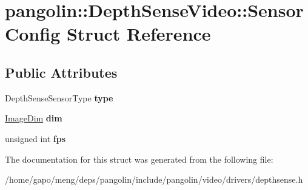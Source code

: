 \hypertarget{structpangolin_1_1_depth_sense_video_1_1_sensor_config}{}\section{pangolin\+:\+:Depth\+Sense\+Video\+:\+:Sensor\+Config Struct Reference}
\label{structpangolin_1_1_depth_sense_video_1_1_sensor_config}
\subsection*{Public Attributes}
\begin{DoxyCompactItemize}
\item 
Depth\+Sense\+Sensor\+Type {\bfseries type}\hypertarget{structpangolin_1_1_depth_sense_video_1_1_sensor_config_ac4c33357c308ccc3c16fff29bcfa0675}{}\label{structpangolin_1_1_depth_sense_video_1_1_sensor_config_ac4c33357c308ccc3c16fff29bcfa0675}

\item 
\hyperlink{structpangolin_1_1_image_dim}{Image\+Dim} {\bfseries dim}\hypertarget{structpangolin_1_1_depth_sense_video_1_1_sensor_config_afca75db803ad81a151910b4d637e08e7}{}\label{structpangolin_1_1_depth_sense_video_1_1_sensor_config_afca75db803ad81a151910b4d637e08e7}

\item 
unsigned int {\bfseries fps}\hypertarget{structpangolin_1_1_depth_sense_video_1_1_sensor_config_a2093c03e53ccfe4a48557bf3a3918a72}{}\label{structpangolin_1_1_depth_sense_video_1_1_sensor_config_a2093c03e53ccfe4a48557bf3a3918a72}

\end{DoxyCompactItemize}


The documentation for this struct was generated from the following file\+:\begin{DoxyCompactItemize}
\item 
/home/gapo/meng/deps/pangolin/include/pangolin/video/drivers/depthsense.\+h\end{DoxyCompactItemize}

